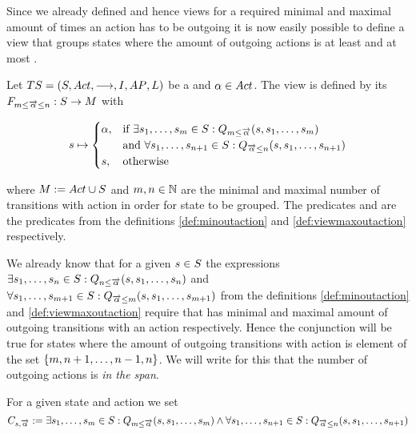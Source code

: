 \documentclass[preview]{standalone}
\begin{document}
Since we already defined \grpfctsN and hence views for a required minimal and maximal amount of times an action has to be outgoing it is now easily possible to define a view that groups states where the amount of outgoing actions is at least \numoutact and at most \numoutactb. 

\begin{definition}
	Let $\ts = \transitionsystem$ be a \chosengraphtypeN and $\action \in \actions$. The view 
	\viewspanoutaction is defined by its \grpfctN $\gfctspanoutaction : \states \to \arbset$ with
	
	\[
	\state \mapsto
	\begin{cases}
		\action,				& \text{if } \exists \state_1, \dots, \state_\numoutactb \in \states: \predminoutact[\numoutactb] \\ &\text{and } \forall \state_1, \dots, \state_{\numoutact+1} \in \states: \predmaxoutact \\
		\state,          	& \text{otherwise}
	\end{cases}
	\]
	
	where $\imggrp := \actions \cup \states$ and $\numoutactb, \numoutact \in \natnums$ are the minimal and maximal number of transitions with action \action in order for state to be grouped. The predicates \predminoutact and \predmaxoutact are the predicates from the definitions \ref{def:minoutaction} and \ref{def:viewmaxoutaction} respectively.
\end{definition}

We already know that for a given $\state \in \states$ the expressions $\exists \state_1, \dots, \state_\numoutact \in \states: \predminoutact$ and $\forall \state_1, \dots, \state_{\numoutactb+1} \in \states: \predmaxoutact[\numoutactb]$ from the definitions \ref{def:minoutaction} and \ref{def:viewmaxoutaction} require that \state has minimal and maximal amount of outgoing transitions with an action \action respectively. Hence the conjunction will be true for states where the amount of outgoing transitions with action \action is element of the set $\{\numoutactb, \numoutact+1, \dots, \numoutact-1, \numoutact\}$. We will write for this that the number of outgoing actions is \emph{in the span}.

For a given state \state and action \action we set
\[
\formoutact:= \exists \state_1, \dots, \state_\numoutactb \in \states: \predminoutact[\numoutactb]\land \\
\forall \state_1, \dots, \state_{\numoutact+1} \in \states: \predmaxoutact
\]
\end{document}
